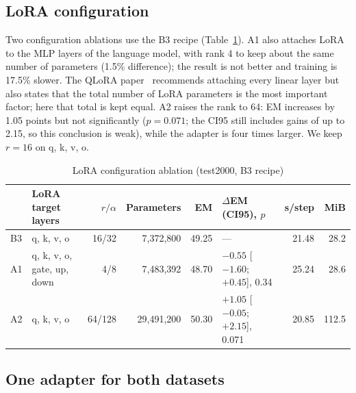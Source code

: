 \subsection{LoRA configuration}

Two configuration ablations use the B3 recipe (Table~\ref{tab:res-lora}). A1 also attaches
LoRA to the MLP layers of the language model, with rank 4 to keep about the same number of
parameters (1.5\% difference); the result is not better and training is 17.5\% slower. The
QLoRA paper~\cite{dettmers2023qlora} recommends attaching every linear layer but also states
that the total number of LoRA parameters is the most important factor; here that total is
kept equal. A2 raises the rank to 64: EM increases by 1.05 points but not significantly
($p = 0.071$; the CI95 still includes gains of up to 2.15, so this conclusion is weak),
while the adapter is four times larger. We keep $r = 16$ on q, k, v, o.

\begin{table}[htbp]
\caption{LoRA configuration ablation (test2000, B3 recipe)}
\label{tab:res-lora}
\centering
\footnotesize
\begin{tabular}{p{}p{}rrrp{}rr}
\toprule
\raggedright \textbf{} & \raggedright \textbf{LoRA target layers} & \raggedright \textbf{$r/\alpha$} & \raggedright \textbf{Parameters} & \raggedright \textbf{EM} & \raggedright \textbf{$\Delta$EM (CI95), $p$} & \raggedright \textbf{s/step} & \raggedright \textbf{MiB} \tabularnewline
\midrule
\raggedright B3 & \raggedright q, k, v, o & \raggedright 16/32 & \raggedright 7,372,800 & \raggedright 49.25 & \raggedright --- & \raggedright 21.48 & \raggedright 28.2 \tabularnewline
\raggedright A1 & \raggedright q, k, v, o, gate, up, down & \raggedright 4/8 & \raggedright 7,483,392 & \raggedright 48.70 & \raggedright $-0.55$ [$-1.60$; $+0.45$], 0.34 & \raggedright 25.24 & \raggedright 28.6 \tabularnewline
\raggedright A2 & \raggedright q, k, v, o & \raggedright 64/128 & \raggedright 29,491,200 & \raggedright 50.30 & \raggedright $+1.05$ [$-0.05$; $+2.15$], 0.071 & \raggedright 20.85 & \raggedright 112.5 \tabularnewline
\bottomrule
\end{tabular}
\end{table}

\subsection{One adapter for both datasets}
\label{sec:res-sh}

